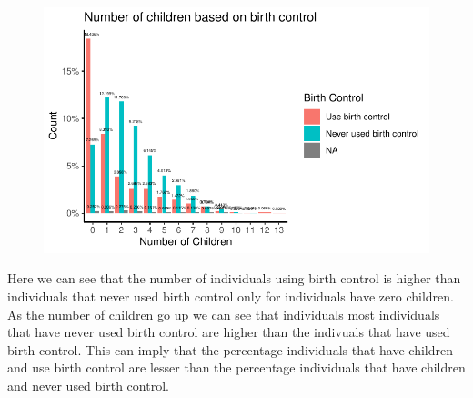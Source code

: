 \documentclass[
  letterpaper,
  DIV=11,
  numbers=noendperiod]{scrartcl}
\begin{document}
\begin{figure}[H]

{\centering \includegraphics{Fertility_Rates_Education_Impact_Botswana_files/figure-pdf/unnamed-chunk-24-1.pdf}

}

\end{figure}

Here we can see that the number of individuals using birth control is
higher than individuals that never used birth control only for
individuals have zero children. As the number of children go up we can
see that individuals most individuals that have never used birth control
are higher than the indivuals that have used birth control. This can
imply that the percentage individuals that have children and use birth
control are lesser than the percentage individuals that have children
and never used birth control.
\end{document}
